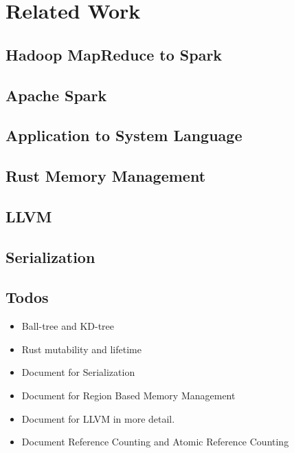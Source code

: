 \chapter{Related Work}
\label{chapter:relatedwork}
\thispagestyle{myheadings}

\graphicspath{{2_RelatedWork/Figures/}}

\section{Hadoop MapReduce to Spark}
\label{sec:history}


\section{Apache Spark}
\label{sec:history}


\section{Application to System Language}
\label{sec:history}


\section{Rust Memory Management}
\label{sec:history}


\section{LLVM}
\label{sec:history}


\section{Serialization}
\label{sec:history}



\section{Todos}
\label{sec:history}
\begin{itemize}
    \item Ball-tree and KD-tree
    \item Rust mutability and lifetime
    \item Document for Serialization
    \item Document for Region Based Memory Management
    \item Document for LLVM in more detail.
    \item Document Reference Counting and Atomic Reference Counting
\end{itemize}
\clearpage




